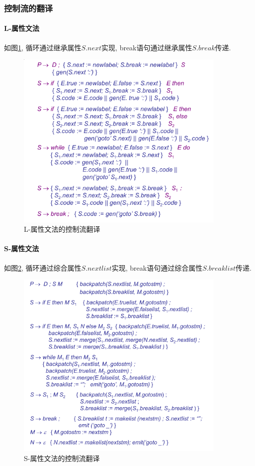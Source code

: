 \documentclass{ctexart}
\begin{document}
\subsubsection{控制流的翻译}
\paragraph{L-属性文法}
    如图\ref{ctrlflow-1},
    循环通过继承属性$S.next$实现, break语句通过继承属性$S.break$传递.
    \begin{figure}[ht]
    \centering
    \includegraphics[width=0.9\textwidth]{ctrlflow-1.png}
    \caption{L-属性文法的控制流翻译}
    \label{ctrlflow-1}
    \end{figure}

\paragraph{S-属性文法}
    如图\ref{ctrlflow-2},
    循环通过综合属性$S.nextlist$实现, break语句通过综合属性$S.breaklist$传递.
    \begin{figure}[ht]
    \centering
    \includegraphics[width=0.9\textwidth]{ctrlflow-2.png}
    \caption{S-属性文法的控制流翻译}
    \label{ctrlflow-2}
    \end{figure}
    \FloatBarrier
\end{document}
